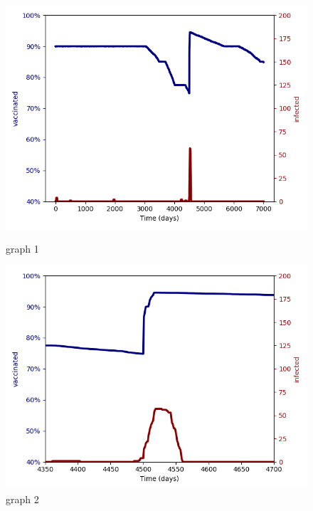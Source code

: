 \documentclass[11pt]{article}
\begin{document}
\begin{figure}
\centering
\begin{minipage}{.5\textwidth}
  \centering
  \includegraphics[width=1\linewidth]{02aedges200001p2fixedtime5001p5sv0p001}
  \caption{graph 1}  
  \label{fig:test6}
  
\end{minipage}%
\begin{minipage}{.5\textwidth}
  \centering
  \includegraphics[width=1\linewidth]{02bedges200001p2fixedtime5001p5sv0p001}
  \caption{graph 2}
  \label{fig:test7}
 
\end{minipage}%
\end{figure}
\end{document}
